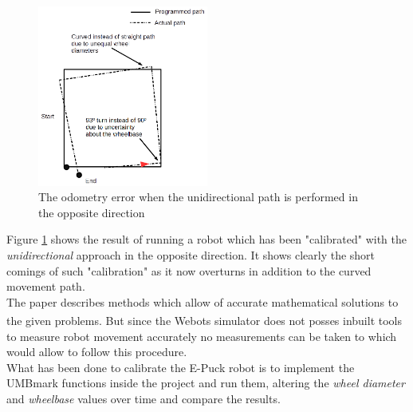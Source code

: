 \begin{figure}[h]
\centering
\includegraphics[width = 0.5\textwidth]{../../figures/unidirectional_error}
\caption{The odometry error when the unidirectional path is performed in the opposite direction}
\label{unidirectional_error}
\end{figure}

Figure \ref{unidirectional_error} shows the result of running a robot which has been "calibrated" with the \textit{unidirectional} approach in the opposite direction. It shows clearly the short comings of such "calibration" as it now overturns in addition to the curved movement path.\\[3ex]

The paper describes methods which allow of accurate mathematical solutions to the given problems. But since the  Webots\textsuperscript{\texttrademark} simulator does not posses inbuilt tools to measure robot movement accurately no measurements can be taken to which would allow to follow this procedure.\\
What has been done to calibrate the E-Puck robot is to implement the UMBmark functions inside the project and run them, altering the \textit{wheel diameter} and \textit{wheelbase} values over time and compare the results.\\


